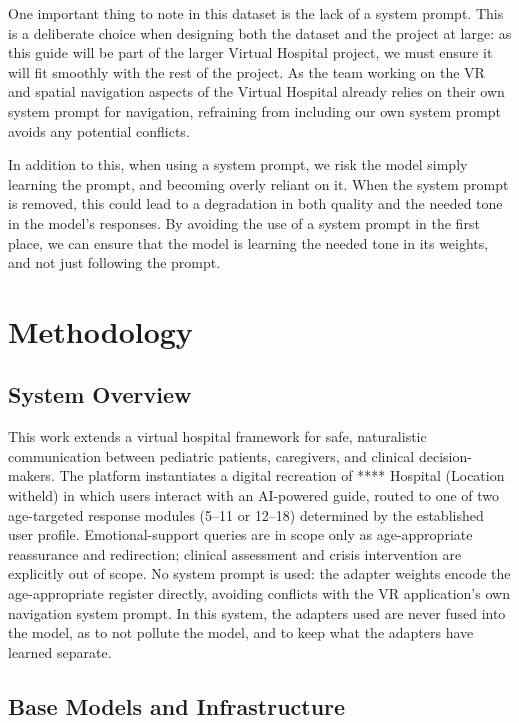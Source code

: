 \documentclass[ASNA,twocolumn]{USG} %
\begin{document}
One important thing to note in this dataset is the lack of a system prompt. This is a deliberate choice when designing both the dataset and the project at large: as this guide will be part of the larger Virtual Hospital project, we must ensure it will fit smoothly with the rest of the project. As the team working on the VR and spatial navigation aspects of the Virtual Hospital already relies on their own system prompt for navigation, refraining from including our own system prompt avoids any potential conflicts.

In addition to this, when using a system prompt, we risk the model simply learning the prompt, and becoming overly reliant on it. When the system prompt is removed, this could lead to a degradation in both quality and the needed tone in the model's responses. By avoiding the use of a system prompt in the first place, we can ensure that the model is learning the needed tone in its weights, and not just following the prompt.

\section{Methodology}\label{sec:methodology}

\subsection{System Overview}

This work extends a virtual hospital framework for safe, naturalistic communication between pediatric patients, caregivers, and clinical decision-makers. The platform instantiates a digital recreation of **** Hospital (Location witheld) in which users interact with an AI-powered guide, routed to one of two age-targeted response modules (5--11 or 12--18) determined by the established user profile. Emotional-support queries are in scope only as age-appropriate reassurance and redirection; clinical assessment and crisis intervention are explicitly out of scope. No system prompt is used: the adapter weights encode the age-appropriate register directly, avoiding conflicts with the VR application's own navigation system prompt. In this system, the adapters used are never fused into the model, as to not pollute the model, and to keep what the adapters have learned separate.

\subsection{Base Models and Infrastructure}
\end{document}
